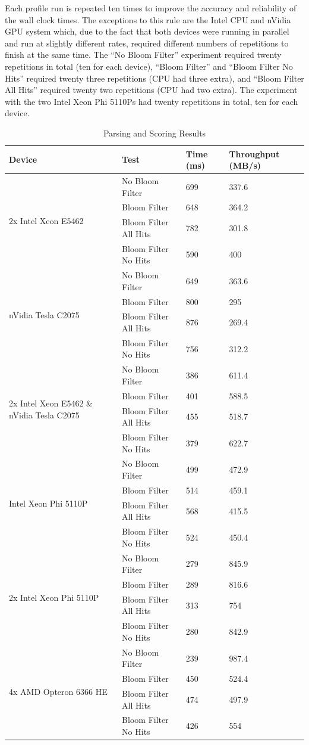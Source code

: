 Each profile run is repeated ten times to improve the accuracy and reliability
of the wall clock times. The exceptions to this rule are the Intel CPU and
nVidia GPU system which, due to the fact that both devices were running in
parallel and run at slightly different rates, required different numbers of
repetitions to finish at the same time. The ``No Bloom Filter'' experiment
required twenty repetitions in total (ten for each device), ``Bloom Filter'' and
``Bloom Filter No Hits'' required twenty three repetitions (CPU had three
extra), and ``Bloom Filter All Hits'' required twenty two repetitions (CPU had
two extra). The experiment with the two Intel Xeon Phi 5110Ps had twenty
repetitions in total, ten for each device.

\begin{table}[H]
\begin{tabular}{|l|l|l|l|}
\hline
Device & Test & Time (ms) & Throughput (MB/s)\\
\hline
\multirow{4}{*}{2x Intel Xeon E5462}
& No Bloom Filter & 699 & 337.6 \\
& Bloom Filter & 648 & 364.2 \\
& Bloom Filter All Hits & 782 & 301.8 \\
& Bloom Filter No Hits & 590 & 400 \\
\hline
\multirow{4}{*}{nVidia Tesla C2075}
& No Bloom Filter & 649 & 363.6 \\
& Bloom Filter & 800 & 295 \\
& Bloom Filter All Hits & 876 & 269.4 \\
& Bloom Filter No Hits & 756 & 312.2 \\
\hline
\multirow{4}{*}{2x Intel Xeon E5462 \& nVidia Tesla C2075}
& No Bloom Filter & 386 & 611.4 \\
& Bloom Filter & 401 & 588.5 \\
& Bloom Filter All Hits & 455 & 518.7 \\
& Bloom Filter No Hits & 379 & 622.7 \\
\hline
\multirow{4}{*}{Intel Xeon Phi 5110P}
& No Bloom Filter & 499 & 472.9 \\
& Bloom Filter & 514 & 459.1 \\
& Bloom Filter All Hits & 568 & 415.5 \\
& Bloom Filter No Hits & 524 & 450.4 \\
\hline
\multirow{4}{*}{2x Intel Xeon Phi 5110P}
& No Bloom Filter & 279 & 845.9 \\
& Bloom Filter & 289 & 816.6 \\
& Bloom Filter All Hits & 313 & 754 \\
& Bloom Filter No Hits & 280 & 842.9 \\
\hline
\multirow{4}{*}{4x AMD Opteron 6366 HE}
& No Bloom Filter & 239 & 987.4 \\
& Bloom Filter & 450 & 524.4 \\
& Bloom Filter All Hits & 474 & 497.9 \\
& Bloom Filter No Hits & 426 & 554 \\
\hline
\end{tabular}
\caption{Parsing and Scoring Results}
\label{table:parsingScoring}
\end{table}

